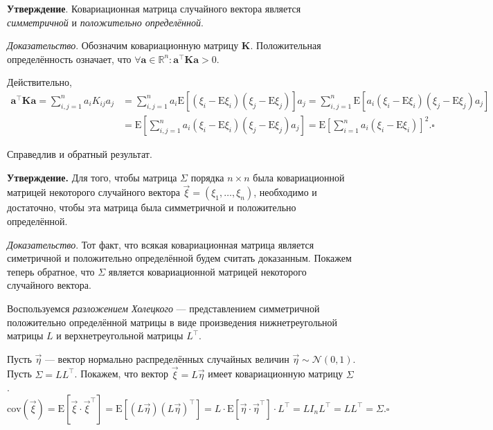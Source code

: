 \documentclass[11pt,a4paper]{article}
\begin{document}
    \textbf{Утверждение}. Ковариационная матрица случайного вектора является
\emph{симметричной} и \emph{положительно определённой}.

\emph{Доказательство}. Обозначим ковариационную матрицу \(\mathbf{K}\).
Положительная определённость означает, что
\(\forall \mathbf{a} \in \mathbb{R}^n: \mathbf{a}^\top \mathbf{K} \mathbf{a} > 0\).

Действительно, \[
\begin{split}
  \mathbf{a}^\top \mathbf{K} \mathbf{a}
  = \sum\limits_{i,j=1}^n a_i K_{ij} a_j
 &= \sum\limits_{i,j=1}^n a_i \mathrm{E}\left[ (\xi_i - \mathrm{E}\xi_i) (\xi_j - \mathrm{E}\xi_j) \right] a_j
  = \sum\limits_{i,j=1}^n \mathrm{E}\left[ a_i (\xi_i - \mathrm{E}\xi_i) (\xi_j - \mathrm{E}\xi_j) a_j \right] \\
 &= \mathrm{E}\left[ \sum\limits_{i,j=1}^n a_i (\xi_i - \mathrm{E}\xi_i) (\xi_j - \mathrm{E}\xi_j) a_j \right]
  = \mathrm{E}\left[ \sum\limits_{i=1}^n a_i (\xi_i - \mathrm{E}\xi_i) \right]^2. \mathrm{\square}
\end{split}
\]

    Справедлив и обратный результат.

\textbf{Утверждение.} Для того, чтобы матрица \(\Sigma\) порядка
\(n \times n\) была ковариационной матрицей некоторого случайного
вектора \(\vec\xi = \left( \xi_1, \dots, \xi_n \right)\), необходимо и
достаточно, чтобы эта матрица была симметричной и положительно
определённой.

\emph{Доказательство}. Тот факт, что всякая ковариационная матрица
является симетричной и положительно определённой будем считать
доказанным. Покажем теперь обратное, что \(\Sigma\) является
ковариационной матрицей некоторого случайного вектора.

Воспользуемся \emph{разложением Холецкого} --- представлением
симметричной положительно определённой матрицы в виде произведения
нижнетреугольной матрицы \(L\) и верхнетреугольной матрицы \(L^\top\).

Пусть \(\vec\eta\) --- вектор нормально распределённых случайных величин
\(\vec\eta \sim \mathcal{N}(0, 1)\). Пусть \(\Sigma = L L^\top\).
Покажем, что вектор \(\vec\xi = L\vec\eta\) имеет ковариационную матрицу
\(\Sigma\). \[
  \mathrm{cov}(\vec\xi)
  = \mathrm{E} \left[\vec\xi \cdot \vec\xi^\top \right]
  = \mathrm{E} \left[(L\vec\eta)(L\vec\eta)^\top \right]
  = L \cdot \mathrm{E} \left[\vec\eta \cdot \vec\eta^\top \right] \cdot L^\top
  = L I_n L^\top = LL^\top = \Sigma. \mathrm{\square}
\]
\end{document}

